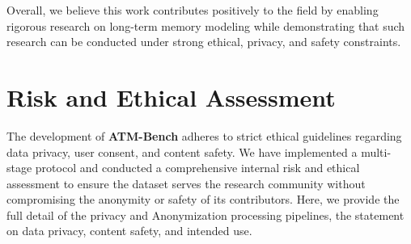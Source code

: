 \documentclass{article}
\theoremstyle{plain}
\theoremstyle{definition}
\theoremstyle{remark}
\begin{document}
Overall, we believe this work contributes positively to the field by enabling rigorous research on long-term memory modeling while demonstrating that such research can be conducted under strong ethical, privacy, and safety constraints.

\newpage
\appendix
\onecolumn

\section{Risk and Ethical Assessment}
\label{app:ethics}
The development of \textbf{ATM-Bench} adheres to strict ethical guidelines regarding data privacy, user consent, and content safety. We have implemented a multi-stage protocol and conducted a comprehensive internal risk and ethical assessment to ensure the dataset serves the research community without compromising the anonymity or safety of its contributors. Here, we provide the full detail of the privacy and Anonymization processing pipelines, the statement on data privacy, content safety, and intended use.
\end{document}
